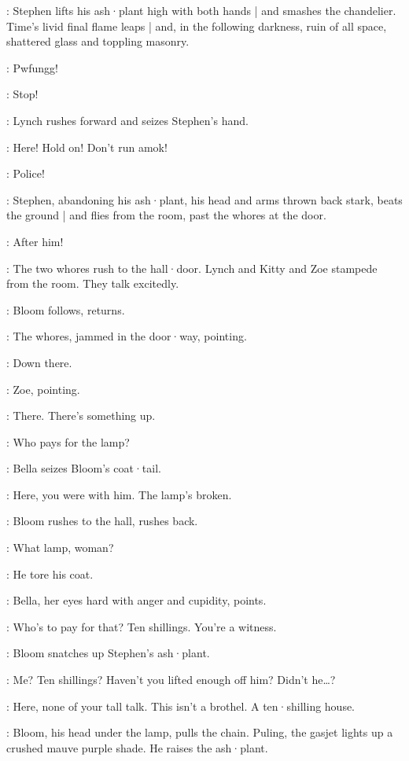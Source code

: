 :
Stephen lifts his ash·plant high with both hands |
and smashes the chandelier.
Time's livid final flame leaps |
and,
in the following darkness,
ruin of all space,
shattered glass and toppling masonry.

\Gasjet[2]:
Pwfungg!

\Bloom:
Stop!

:
Lynch rushes forward and seizes Stephen's hand.

\Lynch:
Here!
Hold on!
Don't run amok!

\Bella:
Police!

:
Stephen,
abandoning his ash·plant,
his head and arms thrown back stark,
beats the ground |
and flies from the room,
past the whores at the door.

\Bella:
After him!

:
The two whores rush to the hall·door.
%
Lynch and Kitty and Zoe stampede from the room.
They talk excitedly.

:
Bloom follows,
returns.

:
The whores,
jammed in the door·way,
pointing.

\Whores:
Down there.

:
Zoe,
pointing.

\Zoe:
There.
There's something up.

\Bella:
Who pays for the lamp?

:
Bella seizes Bloom's coat·tail.

\Bella:
Here,
you were with him.
The lamp's broken.

:
Bloom rushes to the hall,
rushes back.

\Bloom:
What lamp,
woman?

\AWhore:
He tore his coat.

:
Bella,
her eyes hard with anger and cupidity,
points.

\Bella:
Who's to pay for that?
Ten shillings.
You're a witness.

:
Bloom snatches up Stephen's ash·plant.

\Bloom:
Me?
Ten shillings?
Haven't you lifted enough off him?
Didn't he…?

\Bella:
Here,
none of your tall talk.
This isn't a brothel.
A ten·shilling house.

:
Bloom,
his head under the lamp,
pulls the chain.
Puling,
the gasjet lights up a crushed mauve purple shade.
He raises the ash·plant.

